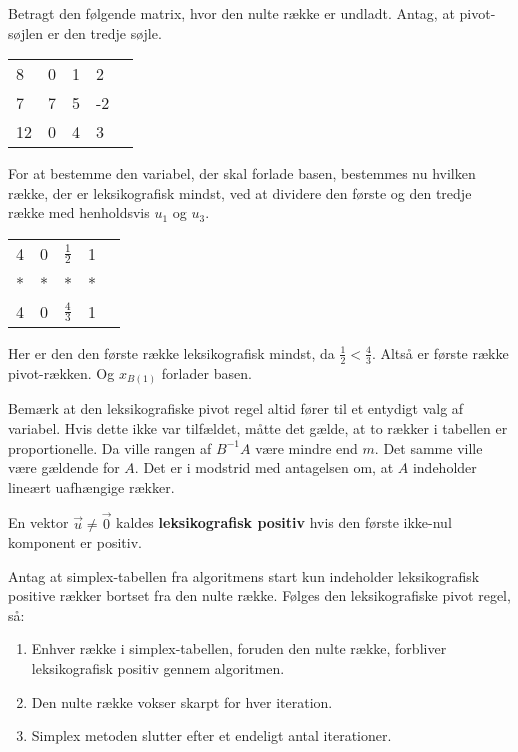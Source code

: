 \begin{eks}
Betragt den følgende matrix, hvor den nulte række er undladt. Antag, at pivot-søjlen er den tredje søjle. 

\begin{center}
\begin{tabular}{|l|llll|}
\hline
8  & 0 & 1 & 2  &  \\
7  & 7 & 5 & -2 &  \\
12 & 0 & 4 & 3  &  \\
\hline
\end{tabular}
\end{center}
For at bestemme den variabel, der skal forlade basen, bestemmes nu hvilken række, der er leksikografisk mindst, ved at dividere den første og den tredje række med henholdsvis $u_1$ og $u_3$.
\begin{center}
\begin{tabular}{|l|llll|}
\hline
4  & 0 & $\frac{1}{2}$ & 1  &  \\
*  & * & * & * &  \\
4 & 0 & $\frac{4}{3}$ & 1  &  \\
\hline
\end{tabular}
\end{center}
Her er den den første række leksikografisk mindst, da $\frac{1}{2}<\frac{4}{3}$.  Altså er første række pivot-rækken. Og $x_{B(1)}$ forlader basen. 
\end{eks}

Bemærk at den leksikografiske pivot regel altid fører til et entydigt valg af variabel. Hvis dette ikke var tilfældet, måtte det gælde, at to rækker i tabellen er proportionelle. Da ville rangen af $B^{-1}A$ være mindre end $m$. Det samme ville være gældende for $A$. Det er i modstrid med antagelsen om, at $A$ indeholder lineært uafhængige rækker. 

\begin{defn}
En vektor $\vec{u} \neq \vec{0}$ kaldes \textbf{leksikografisk positiv} hvis den første ikke-nul komponent er positiv.\citep{lexipositiv} 
\end{defn}

 
\begin{stn}
Antag at simplex-tabellen fra algoritmens start kun indeholder leksikografisk positive rækker bortset fra den nulte række. Følges den leksikografiske pivot regel, så: 
\begin{enumerate}[label=(\alph*)]
\item Enhver række i simplex-tabellen, foruden den nulte række, forbliver leksikografisk positiv gennem algoritmen. 
\item Den nulte række vokser skarpt for hver iteration. 
\item Simplex metoden slutter efter et endeligt antal iterationer. 
\end{enumerate}
\label{stn:lexi}
\end{stn}

